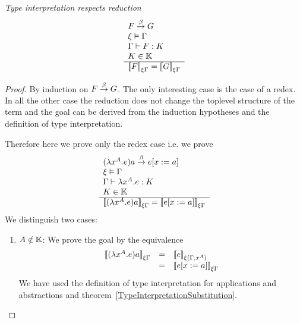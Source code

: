 \begin{theorem}
    \label{TypeInterpretationRespectsReduction}
    \emph{Type interpretation respects reduction}
    $$
    \begin{array}{l} 
        F \stackrel{\beta}{\to} G
        \\
        \xi \vDash \Gamma
        \\
        \Gamma \vdash F : K
        \\
        K \in \mathbb{K}
     \\ \hline 
        {{{[\![}F {]\!]}}_{\xi\Gamma}} = {{{[\![} G {]\!]}}_{\xi\Gamma}}
    \end{array}
    $$
    \begin{proof} By induction on $F \stackrel{\beta}{\to} G$. The only interesting case is
        the case of a redex. In all the other case the reduction does not change
        the toplevel structure of the term and the goal can be derived from the
        induction hypotheses and the definition of type interpretation.

        Therefore here we prove only the redex case i.e. we prove
        $$
        \begin{array}{l} 
            (\lambda x^A.e)a \stackrel{\beta}{\to} e[x:=a]
            \\
            \xi \vDash \Gamma
            \\
            \Gamma \vdash \lambda x^A.e : K
            \\
            K \in \mathbb{K}
         \\ \hline 
            {{{[\![}(\lambda x^A.e) a {]\!]}}_{\xi\Gamma}}
            =
            {{{[\![} e[x:=a] {]\!]}}_{\xi\Gamma}}
        \end{array}
        $$
        We distinguish two cases:
        \begin{enumerate}
        \item $A \notin \mathbb{K}$: We prove the goal by the equivalence
            $$
            \begin{array}{lll}
                {{{[\![}(\lambda x^A.e)a {]\!]}}_{\xi\Gamma}}
                &=&
                {{{[\![} e {]\!]}}_{\xi(\Gamma,x^A)}}
                \\
                &=&
                {{{[\![} e[x:=a] {]\!]}}_{\xi\Gamma}}
            \end{array}
            $$
            We have used the definition of type interpretation for applications and
                abstractions and
                theorem~\ref{TypeInterpretationSubstitution}.


\end{enumerate}
\end{proof}
\end{theorem}
